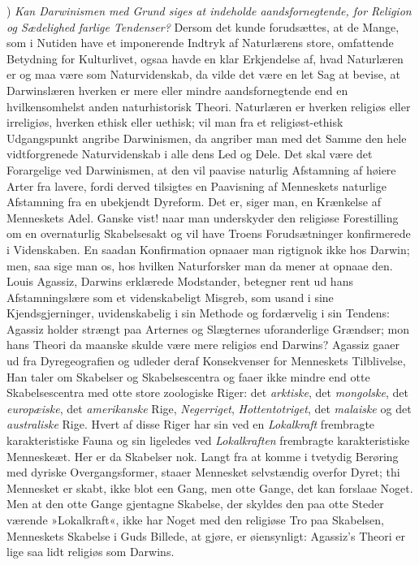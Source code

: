 \documentclass[12pt,a4paper]{article}
\newcommand{\apage}[1]{\marginnote{\footnotesize\textit{[#1]}}}
\begin{document}

\medskip

) \emph{Kan Darwinismen med Grund siges at indeholde
aandsfornegtende, for Religion og Sædelighed farlige Tendenser?}
Dersom det kunde forudsættes, at de Mange, som i Nutiden have et
imponerende Indtryk af Naturlærens store, omfattende Betydning for
Kulturlivet, ogsaa havde en klar Erkjendelse af, hvad Naturlæren er og
maa være som Naturvidenskab, da vilde det være en let Sag at bevise,
at Darwinslæren hverken er mere eller mindre aandsfornegtende end en
hvilkensomhelst anden naturhistorisk Theori.
Naturlæren er hverken religiøs eller irreligiøs, hverken ethisk eller
uethisk; vil man fra et religiøst-ethisk Udgangspunkt angribe
Darwinismen, da angriber man med det Samme den hele vidtforgrenede
Naturvidenskab i alle dens Led og Dele.
Det skal være det Forargelige ved Darwinismen, at den vil paavise
naturlig Afstamning af høiere Arter fra lavere, fordi derved tilsigtes
en Paavisning af Menneskets naturlige Afstamning fra en ubekjendt
Dyreform. Det er, siger man, en Krænkelse af Menneskets Adel. Ganske
vist! naar man underskyder den religiøse Forestilling om en
overnaturlig Skabelsesakt og vil have Troens \apage{457}Forudsætninger
konfirmerede i Videnskaben. En saadan Konfirmation opnaaer man
rigtignok ikke hos Darwin; men, saa sige man os, hos hvilken
Naturforsker man da mener at opnaae den.
Louis Agassiz, Darwins erklærede Modstander, betegner rent ud hans
Afstamningslære som et videnskabeligt Misgreb, som usand i sine
Kjendsgjerninger, uvidenskabelig i sin Methode og fordærvelig i sin
Tendens: Agassiz holder strængt paa Arternes og Slægternes uforanderlige
Grændser; mon hans Theori da maanske skulde være mere religiøs end
Darwins? Agassiz gaaer ud fra Dyregeografien og udleder deraf
Konsekvenser for Menneskets Tilblivelse, Han taler om Skabelser og
Skabelsescentra og faaer ikke mindre end otte Skabelsescentra med otte
store zoologiske Riger: det \emph{arktiske}, det \emph{mongolske}, det \emph{europæiske},
det \emph{amerikanske} Rige, \emph{Negerriget}, \emph{Hottentotriget}, det \emph{malaiske} og det
\emph{australiske} Rige. Hvert af disse Riger har sin ved en \emph{Lokalkraft}
frembragte karakteristiske Fauna og sin ligeledes ved \emph{Lokalkraften}
frembragte karakteristiske Menneskeæt. Her er da Skabelser nok. Langt
fra at komme i tvetydig Berøring med dyriske Overgangsformer, staaer
Mennesket selvstændig overfor Dyret; thi Mennesket er skabt, ikke blot
een Gang, men otte Gange, det kan forslaae Noget. Men at den otte Gange
gjentagne Skabelse, der skyldes den paa otte Steder værende »Lokalkraft«,
ikke har Noget med den religiøse Tro paa Skabelsen, Menneskets Skabelse
i Guds Billede, at gjøre, er øiensynligt: Agassiz's Theori er lige saa
lidt religiøs som Darwins.
\end{document}
